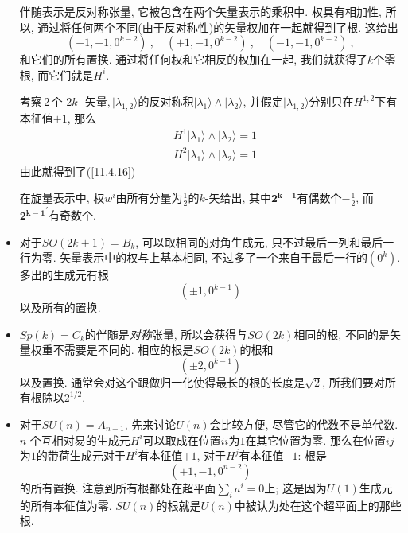 \begin{itemize}
    伴随表示是反对称张量, 它被包含在两个矢量表示的乘积中. 权具有相加性, 所以, 通过将任何两个不同(由于反对称性)的矢量权加在一起就得到了根. 这给出
    \begin{equation}
        (+1,+1,0^{k-2})\:,\quad (+1,-1,0^{k-2})\:,\quad (-1,-1,0^{k-2})\:, \label{11.4.16}
    \end{equation}
    和它们的所有置换. 通过将任何权和它相反的权加在一起, 我们就获得了$ k $个零根, 而它们就是$ H^{i}$.
    \begin{tcolorbox}
    考察\,2\,个 $2k$ -矢量$,\lvert \lambda_{1,2}\rangle$的反对称积$ \lvert\lambda_{1}\rangle\wedge \lvert\lambda_{2}\rangle$, 并假定$ \lvert\lambda_{1,2}\rangle $分别只在$ H^{1,2} $下有本征值$ +1$, 那么
    \begin{align*}
        &H^{1}\lvert \lambda_{1} \rangle \wedge \lvert \lambda_{2} \rangle = 1\\
        &H^{2} \lvert \lambda_{1} \rangle \wedge \lvert \lambda_{2} \rangle =1
    \end{align*}
    由此就得到了(\ref{11.4.16})
    \end{tcolorbox}
    在旋量表示中, 权$ w^{i} $由所有分量为$ \frac{1}{2} $的$ k $-矢给出, 其中$ \mathbf{2^{k-1}} $有偶数个$ -\frac{1}{2}$, 而$ \mathbf{2^{k-1}}^{\prime} $有奇数个.
    \item 对于$ SO(2k+1)=B_{k}$, 可以取相同的对角生成元, 只不过最后一列和最后一行为零. 矢量表示中的权与上基本相同, 不过多了一个来自于最后一行的$ (0^{k})$. 多出的生成元有根
    \begin{equation}
        (\pm1,0^{k-1}) \label{11.4.17}
    \end{equation}
    以及所有的置换.
    \item $Sp(k)=C_{k} $的伴随是{\emph{对称}}张量, 所以会获得与$ SO(2k) $相同的根, 不同的是矢量权重不需要是不同的. 相应的根是$ SO(2k) $的根和
    \begin{equation}
        (\pm2,0^{k-1}) \label{11.4.18}
    \end{equation}
    以及置换. 通常会对这个跟做归一化使得最长的根的长度是$ \sqrt{2}$, 所我们要对所有根除以$ 2^{1/2}$.
    \item 对于$ SU(n)=A_{n-1}$, 先来讨论$ U(n) $会比较方便, 尽管它的代数不是单代数. $n$ 个互相对易的生成元$ H^{i} $可以取成在位置$ ii $为$ 1 $在其它位置为零. 那么在位置$ ij $为$ 1 $的带荷生成元对于$ H^{i} $有本征值$ +1 $, 对于$ H^{j} $有本征值$ -1$: 根是
    \begin{equation}
        (+1,-1,0^{n-2})  \label{11.4.19}
    \end{equation}
    的所有置换. 注意到所有根都处在超平面$ \sum_{i} a^{i}=0 $上; 这是因为$ U(1) $生成元的所有本征值为零. $SU(n) $的根就是$ U(n) $中被认为处在这个超平面上的那些根.

\end{itemize}
